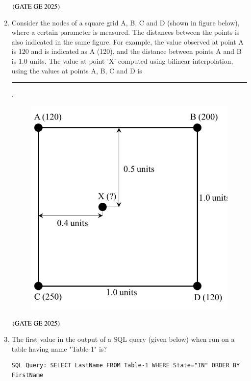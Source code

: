 \documentclass[journal,12pt,onecolumn]{IEEEtran}
\theoremstyle{remark}
\begin{document}
\begin{enumerate}
\begin{enumerate}
\end{enumerate}
\hfill $\left(\text{GATE GE 2025}\right)$
\bigskip
\item Consider the nodes of a square grid A, B, C and D (shown in figure below), where a certain parameter is measured. The distances between the points is also indicated in the same figure. For example, the value observed at point A is 120 and is indicated as A (120), and the distance between points A and B is 1.0 units. The value at point 'X' computed using bilinear interpolation, using the values at points A, B, C and D is \rule{2cm}{0.5mm}.
\begin{figure}[H]
    \centering
    \includegraphics[width=0.4\columnwidth]{figs/fig6.png}
    \caption{}
    \label{figs:fig6}
\end{figure}
\begin{enumerate}
\end{enumerate}
\hfill $\left(\text{GATE GE 2025}\right)$
\bigskip
\item The first value in the output of a SQL query (given below) when run on a table having name "Table-1" is?
\begin{verbatim}
SQL Query: SELECT LastName FROM Table-1 WHERE State="IN" ORDER BY FirstName
\end{verbatim}

\end{enumerate}
\end{document}
